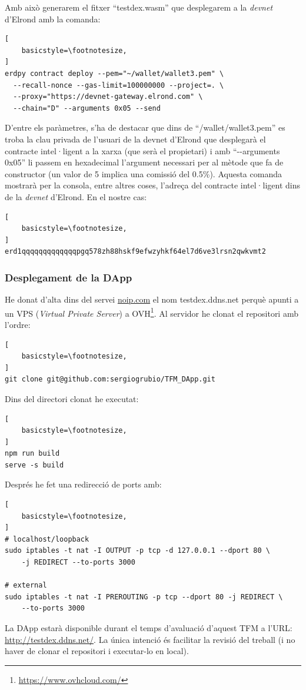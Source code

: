 \documentclass[11pt,a4paper]{article}
\makeatletter
\renewcommand\footnotesize{%
   \@setfontsize\footnotesize\@ixpt{9}%
   \abovedisplayskip 8\p@ \@plus2\p@ \@minus4\p@
   \abovedisplayshortskip \z@ \@plus\p@
   \belowdisplayshortskip 4\p@ \@plus2\p@ \@minus2\p@
   \def\@listi{\leftmargin\leftmargini
               \topsep 4\p@ \@plus2\p@ \@minus2\p@
               \parsep 2\p@ \@plus\p@ \@minus\p@
               \itemsep \parsep}%
   \belowdisplayskip \abovedisplayskip
}
\makeatother
\begin{document}
Amb això generarem el fitxer ``testdex.wasm'' que desplegarem a la \textit{devnet} d'Elrond amb la comanda:
\begin{lstlisting}[
    basicstyle=\footnotesize,
]
erdpy contract deploy --pem="~/wallet/wallet3.pem" \
  --recall-nonce --gas-limit=100000000 --project=. \
  --proxy="https://devnet-gateway.elrond.com" \
  --chain="D" --arguments 0x05 --send
\end{lstlisting}

D'entre els paràmetres, s'ha de destacar que dins de ``{\texttildelow/wallet/wallet3.pem}'' es troba la clau privada de l'usuari de la devnet d'Elrond que desplegarà el contracte intel·ligent a la xarxa (que serà el propietari) i amb ``-{}-arguments 0x05'' li passem en hexadecimal l'argument necessari per al mètode que fa de constructor (un valor de 5 implica una comissió del 0.5\%). Aquesta comanda mostrarà per la consola, entre altres coses, l'adreça del contracte intel·ligent dins de la \textit{devnet} d'Elrond. En el nostre cas:
\begin{lstlisting}[
    basicstyle=\footnotesize,
]
erd1qqqqqqqqqqqqqpgq578zh88hskf9efwzyhkf64el7d6ve3lrsn2qwkvmt2
\end{lstlisting}

\subsubsection{Desplegament de la DApp}
He donat d'alta dins del servei \url{noip.com} el nom testdex.ddns.net perquè apunti a un VPS (\textit{Virtual Private Server}) a OVH\footnote{\url{https://www.ovhcloud.com/}}. Al servidor he clonat el repositori amb l'ordre:
\begin{lstlisting}[
    basicstyle=\footnotesize,
]
git clone git@github.com:sergiogrubio/TFM_DApp.git
\end{lstlisting}
Dins del directori clonat he executat:
\begin{lstlisting}[
    basicstyle=\footnotesize,
]
npm run build
serve -s build
\end{lstlisting}
Després he fet una redirecció de ports amb:
\begin{lstlisting}[
    basicstyle=\footnotesize,
]
# localhost/loopback
sudo iptables -t nat -I OUTPUT -p tcp -d 127.0.0.1 --dport 80 \
	-j REDIRECT --to-ports 3000

# external
sudo iptables -t nat -I PREROUTING -p tcp --dport 80 -j REDIRECT \
	--to-ports 3000
\end{lstlisting}
La DApp estarà disponible durant el temps d'avaluació d'aquest TFM a l'URL:
\url{http://testdex.ddns.net/}. La única intenció és facilitar la revisió del treball (i no haver de clonar el repositori i executar-lo en local).
\end{document}
